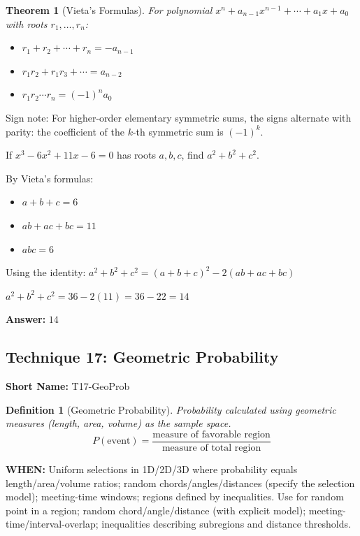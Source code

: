 \documentclass[12pt]{article}
\newtheorem{definition}{Definition}[section]
\newtheorem{theorem}{Theorem}[section]
\newenvironment{problem}[1]
{\begin{tcolorbox}[colback=blue!5!white,colframe=blue!75!black,title={#1}]}{\end{tcolorbox}}
\newenvironment{solution}
{\begin{tcolorbox}[colback=green!5!white,colframe=green!75!black,title={Solution}]}{\end{tcolorbox}}
\begin{document}
\begin{theorem}[Vieta's Formulas]
For polynomial $x^n + a_{n-1}x^{n-1} + \cdots + a_1x + a_0$ with roots $r_1, \ldots, r_n$:
\begin{itemize}
    \item $r_1 + r_2 + \cdots + r_n = -a_{n-1}$
    \item $r_1r_2 + r_1r_3 + \cdots = a_{n-2}$
    \item $r_1r_2 \cdots r_n = (-1)^n a_0$
\end{itemize}
\end{theorem}

Sign note: For higher-order elementary symmetric sums, the signs alternate with parity: the coefficient of the $k$-th symmetric sum is $(-1)^k$.

\begin{problem}{Example: Polynomial Roots}
If $x^3 - 6x^2 + 11x - 6 = 0$ has roots $a, b, c$, find $a^2 + b^2 + c^2$.
\end{problem}

\begin{solution}
By Vieta's formulas:
\begin{itemize}
    \item $a + b + c = 6$
    \item $ab + ac + bc = 11$
    \item $abc = 6$
\end{itemize}

Using the identity: $a^2 + b^2 + c^2 = (a + b + c)^2 - 2(ab + ac + bc)$

$a^2 + b^2 + c^2 = 36 - 2(11) = 36 - 22 = 14$

\textbf{Answer:} $14$
\end{solution}

\subsection{Technique 17: Geometric Probability}
\textbf{Short Name:} T17-GeoProb

\begin{definition}[Geometric Probability]
Probability calculated using geometric measures (length, area, volume) as the sample space.
\[
P(\text{event}) = \frac{\text{measure of favorable region}}{\text{measure of total region}}
\]
\end{definition}

\textbf{WHEN:} Uniform selections in 1D/2D/3D where probability equals length/area/volume ratios; random chords/angles/distances (specify the selection model); meeting-time windows; regions defined by inequalities. Use for random point in a region; random chord/angle/distance (with explicit model); meeting-time/interval-overlap; inequalities describing subregions and distance thresholds.
\end{document}
